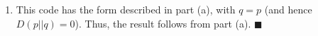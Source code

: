 \documentclass[11pt]{article}
\renewcommand{\qed}{\quad \ensuremath{\blacksquare}}
\begin{document}
\begin{enumerate}
\begin{enumerate}
\begin{enumerate}
\item This code has the form described in part (a), with $q = p$ (and hence
$D(p||q) = 0$). Thus, the result follows from part (a). \qed

\end{enumerate}
\end{enumerate}
\end{enumerate}
\end{document}
